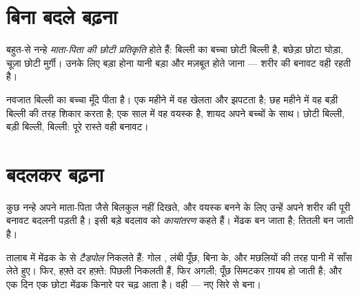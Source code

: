 \section{बिना बदले बढ़ना}

\begin{definition}[माता-पिता जैसे बढ़ना]\label{def:g2:animals-grow-up:direct}
बहुत-से नन्हे  \emph{माता-पिता की छोटी
प्रतिकृति} होते हैं: बिल्ली का
बच्चा छोटी बिल्ली है, बछेड़ा छोटा घोड़ा, चूज़ा छोटी मुर्ग़ी। उनके लिए
बड़ा होना यानी बड़ा और मज़बूत होते जाना --- शरीर की बनावट वही रहती
है।
\end{definition}

\begin{example}[बच्चे से बिल्ली तक]\label{ex:g2:animals-grow-up:kitten}
नवजात बिल्ली का बच्चा  मूँदे  पीता है। एक महीने में वह खेलता
और झपटता है; छह महीने में वह बड़ी बिल्ली की तरह शिकार करता है; एक साल
में वह वयस्क है, शायद अपने बच्चों के साथ। छोटी बिल्ली, बड़ी बिल्ली,
बिल्ली: पूरे रास्ते वही बनावट।
\end{example}

\section{बदलकर बढ़ना}

\begin{definition}[कायांतरण]\label{def:g2:animals-grow-up:metamorphosis}
कुछ नन्हे  अपने माता-पिता जैसे बिलकुल नहीं दिखते, और वयस्क बनने के
लिए उन्हें अपने शरीर की पूरी बनावट बदलनी पड़ती है। इसी बड़े बदलाव को
\emph{कायांतरण} कहते हैं।  मेंढक बन जाता है;
 तितली बन जाती है।
\end{definition}

\begin{example}[मेंढक का रास्ता]\label{ex:g2:animals-grow-up:frog}
तालाब में मेंढक के  से \emph{टैडपोल} निकलते हैं:
गोल , लंबी पूँछ, बिना  के, और मछलियों की तरह पानी में साँस
लेते हुए। फिर, हफ़्ते दर हफ़्ते: पिछली  निकलती हैं, फिर अगली;
पूँछ सिमटकर ग़ायब हो जाती है; और एक दिन एक छोटा मेंढक किनारे पर चढ़
आता है। वही  --- नए सिरे से बना।
\end{example}

